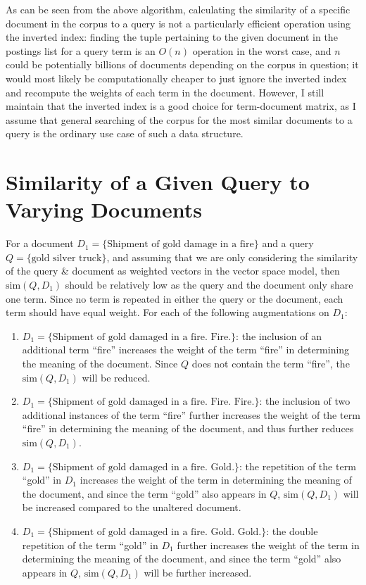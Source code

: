 \documentclass[a4paper]{article}
\begin{document}
As can be seen from the above algorithm, calculating the similarity of a specific document in the corpus to a query is not a particularly efficient operation using the inverted index: finding the tuple pertaining to the given document in the postings list for a query term is an $O(n)$ operation in the worst case, and $n$ could be potentially billions of documents depending on the corpus in question;
it would most likely be computationally cheaper to just ignore the inverted index and recompute the weights of each term in the document.
However, I still maintain that the inverted index is a good choice for term-document matrix, as I assume that general searching of the corpus for the most similar documents to a query is the ordinary use case of such a data structure.

\section{Similarity of a Given Query to Varying Documents}
For a document $D_1 = \{ \text{Shipment of gold damage in a fire} \}$ and a query $Q = \{ \text{gold silver truck} \}$,
and assuming that we are only considering the similarity of the query \& document as weighted vectors in the vector space model, then $\text{sim}(Q, D_1)$ should be relatively low as the query and the document only share one term.
Since no term is repeated in either the query or the document, each term should have equal weight.
For each of the following augmentations on $D_1$:

\begin{enumerate}[label=\alph*)]
    \item   $D_1 = \{ \text{Shipment of gold damaged in a fire. Fire.} \}$:
            the inclusion of an additional term ``fire'' increases the weight of the term ``fire'' in determining the meaning of the document.
            Since $Q$ does not contain the term ``fire'', the $\text{sim}(Q, D_1)$ will be reduced.

    \item   $D_1 = \{ \text{Shipment of gold damaged in a fire. Fire. Fire.} \}$:
            the inclusion of two additional instances of the term ``fire'' further increases the weight of the term ``fire'' in determining the meaning of the document, and thus further reduces $\text{sim}(Q, D_1)$.

    \item   $D_1 = \{ \text{Shipment of gold damaged in a fire. Gold.} \}$:
            the repetition of the term ``gold'' in $D_1$ increases the weight of the term in determining the meaning of the document, and since the term ``gold'' also appears in $Q$, $\text{sim}(Q, D_1)$ will be increased compared to the unaltered document.

    \item   $D_1 = \{ \text{Shipment of gold damaged in a fire. Gold. Gold.} \}$:
            the double repetition of the term ``gold'' in $D_1$ further increases the weight of the term in determining the meaning of the document, and since the term ``gold'' also appears in $Q$, $\text{sim}(Q, D_1)$ will be further increased.
\end{enumerate}
\end{document}

